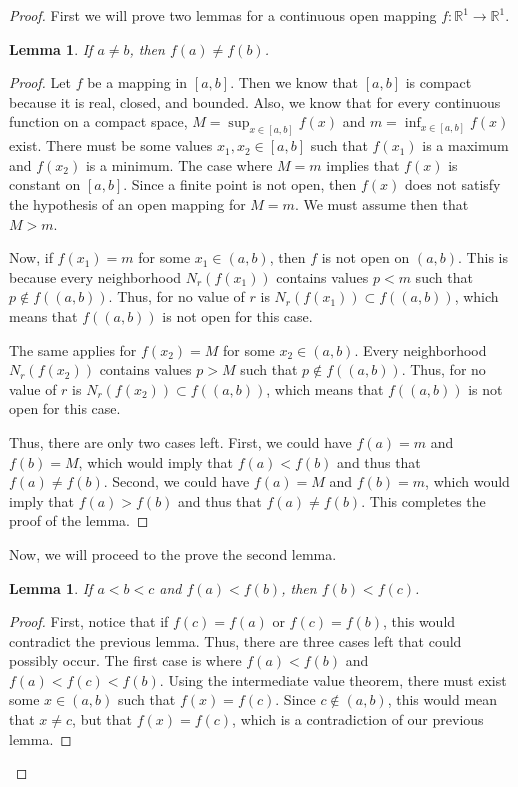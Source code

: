 \documentclass[psamsfonts]{amsart}
\newtheorem{lem}[thm]{Lemma}
\theoremstyle{definition}
\theoremstyle{remark}
\numberwithin{equation}{section}
\begin{document}
\begin{proof}
First we will prove two lemmas for a continuous open mapping $f: \mathbb{R}^1 \rightarrow \mathbb{R}^1$. 

\begin{lem}
If $a \neq b$, then $f(a) \neq f(b)$. 
\end{lem}

\begin{proof}
Let $f$ be a mapping in $[a,b]$. Then we know that $[a,b]$ is compact because it is real, closed, and bounded. Also, we know that for every continuous function on a compact space, $M = \sup_{x \in [a,b]} f(x)$ and $m = \inf_{x \in [a,b]} f(x)$ exist. There must be some values $x_1, x_2 \in [a,b]$ such that $f(x_1)$ is a maximum and $f(x_2)$ is a minimum. The case where $M = m$ implies that $f(x)$ is constant on $[a,b]$. Since a finite point is not open, then $f(x)$ does not satisfy the hypothesis of an open mapping for $M = m$. We must assume then that $M > m$.

Now, if $f(x_1) = m$ for some $x_1 \in (a,b)$, then $f$ is not open on $(a,b)$. This is because every neighborhood $N_r(f(x_1))$ contains values $p < m$ such that $p \notin f((a,b))$. Thus, for no value of $r$ is $N_r(f(x_1)) \subset f((a,b))$, which means that $f((a,b))$ is not open for this case.

The same applies for $f(x_2) = M$ for some $x_2 \in (a,b)$. Every neighborhood $N_r(f(x_2))$ contains values $p > M$ such that $p \notin f((a,b))$. Thus, for no value of $r$ is $N_r(f(x_2)) \subset f((a,b))$, which means that $f((a,b))$ is not open for this case. 

Thus, there are only two cases left. First, we could have $f(a) = m$ and $f(b) = M$, which would imply that $f(a) < f(b)$ and thus that $f(a) \neq f(b)$. Second, we could have $f(a) = M$ and $f(b) = m$, which would imply that $f(a) > f(b)$ and thus that $f(a) \neq f(b)$. This completes the proof of the lemma.
\end{proof}

Now, we will proceed to the prove the second lemma.

\begin{lem}
If $a < b < c$ and $f(a) < f(b)$, then $f(b) < f(c)$. 
\end{lem}

\begin{proof}
First, notice that if $f(c) = f(a)$ or $f(c) = f(b)$, this would contradict the previous lemma. Thus, there are three cases left that could possibly occur. The first case is where $f(a) < f(b)$ and $f(a) < f(c) < f(b)$. Using the intermediate value theorem, there must exist some $x \in (a,b)$ such that $f(x) = f(c)$. Since $c \notin (a,b)$, this would mean that $x \neq c$, but that $f(x) = f(c)$, which is a contradiction of our previous lemma.


\end{proof}
\end{proof}
\end{document}
